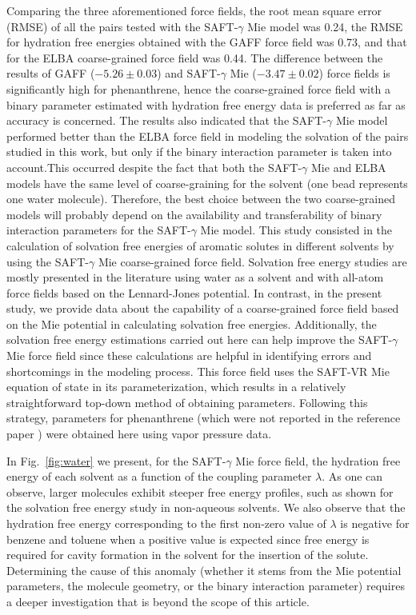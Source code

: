 \documentclass[preprint]{elsarticle}
\begin{document}
	Comparing the three aforementioned force fields, the root mean square error (RMSE) of all the pairs tested with the SAFT-$\gamma$ Mie model was 0.24, the RMSE for hydration free energies obtained with the GAFF force field was 0.73, and that for the ELBA coarse-grained force field was 0.44.
	The difference between the results of GAFF ($-5.26 \pm 0.03$) and SAFT-$\gamma$ Mie ($-3.47 \pm 0.02$) force fields is significantly high for phenanthrene, hence the coarse-grained force field with a binary parameter estimated with hydration free energy data is preferred as far as accuracy is concerned.
	The results also indicated that the SAFT-$\gamma$ Mie model performed better than the ELBA force field in modeling the solvation of the pairs studied in this work, but only if the binary interaction parameter is taken into account.This occurred despite the fact that both the SAFT-$\gamma$ Mie and ELBA models have the same level of coarse-graining for the solvent (one bead represents one water molecule).
	Therefore, the best choice between the two coarse-grained models will probably depend on the availability and transferability of binary interaction parameters for the SAFT-$\gamma$ Mie model.
	This study consisted in the calculation of solvation free energies of aromatic solutes in different solvents by using the SAFT-$\gamma$ Mie coarse-grained force field.
	Solvation free energy studies are mostly presented in the literature using water as a solvent and with all-atom force fields based on the Lennard-Jones potential.
	In contrast, in the present study, we provide data about the capability of a coarse-grained force field based on the Mie potential in calculating solvation free energies.
	Additionally, the solvation free energy estimations carried out here can help improve the SAFT-$\gamma$ Mie force field since these calculations are helpful in identifying errors and shortcomings in the modeling process.
	This force field uses the SAFT-VR Mie equation of state in its parameterization, which results in a relatively straightforward top-down method of obtaining parameters.
	Following this strategy, parameters for phenanthrene (which were not reported in the reference paper \cite{muller2017}) were obtained here using vapor pressure data.

	In Fig.~\ref{fig:water} we present, for the SAFT-$\gamma$ Mie force field, the hydration free energy of each solvent as a function of the coupling parameter $\lambda$.
	As one can observe, larger molecules exhibit steeper free energy profiles, such as shown for the solvation free energy study in non-aqueous solvents.
	We also observe that the hydration free energy corresponding to the first non-zero value of $\lambda$ is negative for benzene and toluene when a positive value is expected since free energy is required for cavity formation in the solvent for the insertion of the solute.
	Determining the cause of this anomaly (whether it stems from the Mie potential parameters, the molecule geometry, or the binary interaction parameter) requires a deeper investigation that is beyond the scope of this article.
	
\end{document}
